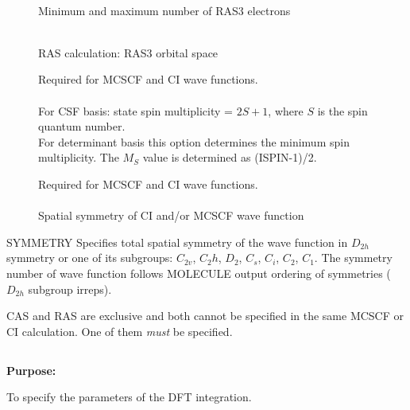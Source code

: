 \begin{description}
\item[]
    \\
   Minimum and maximum number of RAS3 electrons

\item[]
    \\
   RAS calculation: RAS3 orbital space

\item[]
  Required for MCSCF and CI wave
  functions.\\
  \\
  For CSF basis: state spin multiplicity = $2S + 1$,
  where $S$ is the spin quantum number. \\
  For determinant basis this option determines the minimum spin
  multiplicity.  The $M_S$ value is determined as (ISPIN-1)/2.

\item[]
  Required for MCSCF and CI wave functions.\\
   \\
  Spatial symmetry of CI and/or MCSCF wave function

\end{description}


\noindent SYMMETRY   Specifies total spatial symmetry of the wave
function in $D_{2h}$ symmetry or one of its subgroups: $C_{2v}$, $C_2h$,
$D_2$, $C_s$, $C_i$, $C_2$, $C_1$. The  symmetry number of wave
function follows MOLECULE output ordering of symmetries ($D_{2h}$
subgroup irreps).

\noindent
CAS and RAS are exclusive and
both cannot be specified in the same
MCSCF or CI
calculation. One of them {\em must} be specified.

\pagebreak[3]
\subsection{\label{ref-dftinp}}

{\bf Purpose:}

To specify the parameters of the DFT integration.

